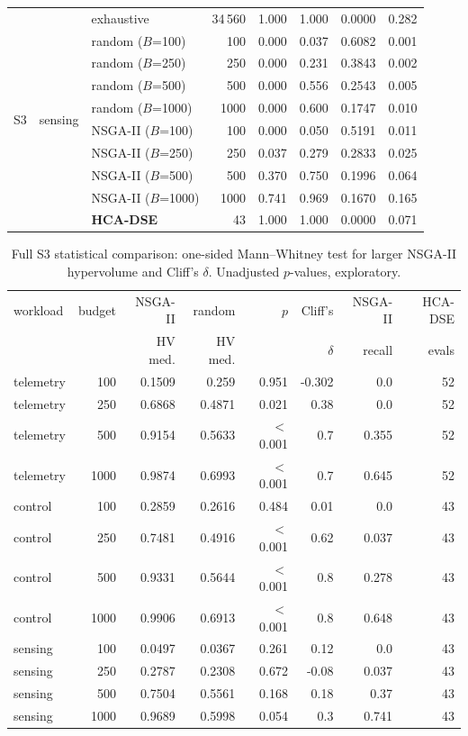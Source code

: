 \documentclass[pdflatex,sn-nature]{sn-jnl}
\theoremstyle{thmstyleone}
\theoremstyle{thmstyletwo}
\theoremstyle{thmstylethree}
\begin{document}
\begin{table}[!htbp]
{\begin{tabular}{lllrrrrr}
\midrule
\multirow{10}{*}{S3} & \multirow{10}{*}{sensing} & exhaustive & 34\,560 & 1.000 & 1.000 & 0.0000 & 0.282 \\
 & & random ($B$=100) & 100 & 0.000 & 0.037 & 0.6082 & 0.001 \\
 & & random ($B$=250) & 250 & 0.000 & 0.231 & 0.3843 & 0.002 \\
 & & random ($B$=500) & 500 & 0.000 & 0.556 & 0.2543 & 0.005 \\
 & & random ($B$=1000) & 1000 & 0.000 & 0.600 & 0.1747 & 0.010 \\
 & & NSGA-II ($B$=100) & 100 & 0.000 & 0.050 & 0.5191 & 0.011 \\
 & & NSGA-II ($B$=250) & 250 & 0.037 & 0.279 & 0.2833 & 0.025 \\
 & & NSGA-II ($B$=500) & 500 & 0.370 & 0.750 & 0.1996 & 0.064 \\
 & & NSGA-II ($B$=1000) & 1000 & 0.741 & 0.969 & 0.1670 & 0.165 \\
 & & \textbf{HCA-DSE} & 43 & 1.000 & 1.000 & 0.0000 & 0.071 \\
\bottomrule
\end{tabular}}
\end{table}

\begin{table}[!htbp]\centering
\caption{Full S3 statistical comparison: one-sided Mann--Whitney test for larger NSGA-II
hypervolume and Cliff's $\delta$. Unadjusted $p$-values, exploratory.}\label{tabS3}
{\let\scriptsize\tiny\setlength{\tabcolsep}{2pt}\scriptsize
\setlength{\tabcolsep}{3.5pt}
\begin{tabular}{lrrrrrrr}
\toprule
workload & budget & NSGA-II & random & $p$ & Cliff's & NSGA-II & HCA-DSE \\
 & & HV med. & HV med. & & $\delta$ & recall & evals \\
\midrule
telemetry & 100 & 0.1509 & 0.259 & 0.951 & -0.302 & 0.0 & 52 \\
telemetry & 250 & 0.6868 & 0.4871 & 0.021 & 0.38 & 0.0 & 52 \\
telemetry & 500 & 0.9154 & 0.5633 & $<$0.001 & 0.7 & 0.355 & 52 \\
telemetry & 1000 & 0.9874 & 0.6993 & $<$0.001 & 0.7 & 0.645 & 52 \\
control & 100 & 0.2859 & 0.2616 & 0.484 & 0.01 & 0.0 & 43 \\
control & 250 & 0.7481 & 0.4916 & $<$0.001 & 0.62 & 0.037 & 43 \\
control & 500 & 0.9331 & 0.5644 & $<$0.001 & 0.8 & 0.278 & 43 \\
control & 1000 & 0.9906 & 0.6913 & $<$0.001 & 0.8 & 0.648 & 43 \\
sensing & 100 & 0.0497 & 0.0367 & 0.261 & 0.12 & 0.0 & 43 \\
sensing & 250 & 0.2787 & 0.2308 & 0.672 & -0.08 & 0.037 & 43 \\
sensing & 500 & 0.7504 & 0.5561 & 0.168 & 0.18 & 0.37 & 43 \\
sensing & 1000 & 0.9689 & 0.5998 & 0.054 & 0.3 & 0.741 & 43 \\
\bottomrule
\end{tabular}}
\end{table}
\end{document}
